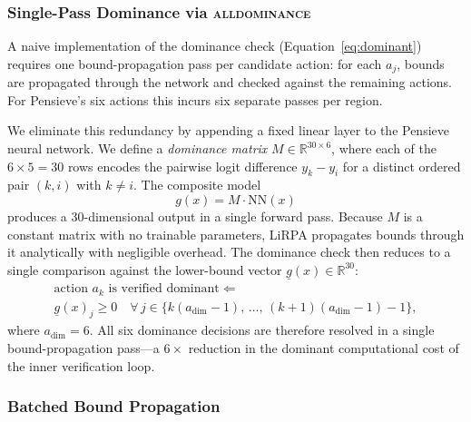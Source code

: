 \documentclass[thesis]{uofithesis} %
\begin{document}
    \subsubsection{Single-Pass Dominance via \textsc{alldominance}}
    \label{sec:verify-alldominance}

    A naive implementation of the dominance check
    (Equation~\ref{eq:dominant}) requires one bound-propagation pass per
    candidate action: for each $a_j$, bounds are propagated through the
    network and checked against the remaining actions.  For Pensieve's six
    actions this incurs six separate passes per region.

    We eliminate this redundancy by appending a fixed linear layer to
    the Pensieve neural network.  We define a \emph{dominance matrix}
    $M \in \mathbb{R}^{30 \times 6}$, where each of the
    $6 \times 5 = 30$ rows encodes the pairwise logit difference $y_k - y_i$
    for a distinct ordered pair $(k,i)$ with $k \neq i$.  The composite model
    \begin{equation}
        g(x) = M \cdot \mathrm{NN}(x)
        \label{eq:alldominance}
    \end{equation}
    produces a $30$-dimensional output in a single forward pass.  Because $M$
    is a constant matrix with no trainable parameters, LiRPA propagates
    bounds through it analytically with negligible overhead.  The dominance
    check then reduces to a single comparison against the lower-bound
    vector $\underline{g}(x) \in \mathbb{R}^{30}$:
    \begin{multline}
        \text{action } a_k \text{ is verified dominant}
        \Longleftarrow \\
        \underline{g}(x)_{j} \geq 0
        \quad \forall\, j \in \bigl\{k(a_{\dim}{-}1),\, \ldots,\,
        (k{+}1)(a_{\dim}{-}1) - 1\bigr\},
        \label{eq:alldominance-check}
    \end{multline}
    where $a_{\dim} = 6$.  All six dominance decisions are therefore resolved
    in a single bound-propagation pass---a $6\times$ reduction in the
    dominant computational cost of the inner verification loop.


    \subsubsection{Batched Bound Propagation}
    \label{sec:verify-batching}
\end{document}

